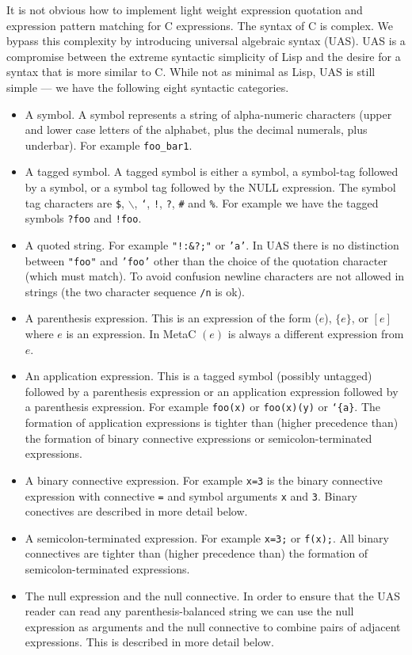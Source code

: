 \documentclass{article}
\begin{document}
It is not obvious how to implement light weight expression quotation and expression pattern matching for C expressions.  The syntax of C is complex.  We bypass this complexity by introducing universal algebraic syntax (UAS).
UAS is a compromise between the extreme syntactic simplicity of Lisp and the desire for a syntax that is more similar to C.
While not as minimal as Lisp, UAS is still simple --- we have the following eight syntactic categories.


\begin{itemize}
\item A symbol.  A symbol represents a string of alpha-numeric characters (upper and lower case letters of the alphabet, plus the decimal numerals, plus underbar).
  For example {\tt  foo\_bar1}.
\item A tagged symbol.  A tagged symbol is either a symbol, a symbol-tag followed by a symbol, or a symbol tag followed by the NULL expression.
The symbol tag characters are {\tt \$}, {\tt $\backslash$}, {\tt `}, {\tt !}, {\tt ?}, {\tt \#} and {\tt \%}.
  For example we have the tagged symbols {\tt ?foo} and {\tt !foo}.
\item A quoted string.  For example {\tt \tt "!:\&?;"} or {\tt 'a'}.  In UAS there is no distinction between {\tt "foo"} and {\tt 'foo'} other than the choice of the quotation character (which must match).
  To avoid confusion newline characters are not allowed in strings (the two character sequence {\tt /n} is ok).
\item A parenthesis expression.  This is an expression of the form ($e$), $\{e\}$, or $[e]$ where $e$ is an expression.  In MetaC $(e)$ is always a different expression from $e$.
\item An application expression.  This is a tagged symbol (possibly untagged) followed by a parenthesis expression or an application expression followed by a parenthesis expression.  For example {\tt foo(x)} or {\tt foo(x)(y)} or {\tt `\{a\}}.
The formation of application expressions is tighter than (higher precedence than) the formation of binary connective expressions or semicolon-terminated expressions.
\item A binary connective expression.  For example {\tt x=3} is the binary connective expression with connective {\tt =} and symbol arguments {\tt x} and {\tt 3}.  Binary conectives are described in more detail below.
\item A semicolon-terminated expression. For example {\tt x=3;} or {\tt f(x);}. All binary connectives are tighter than (higher precedence than)
the formation of semicolon-terminated expressions.
\item The null expression and the null connective. In order to ensure that the UAS reader can read any parenthesis-balanced string we can use the null
  expression as arguments and the null connective to combine pairs of adjacent expressions.  This is described in more detail below.
\end{itemize}
\end{document}

